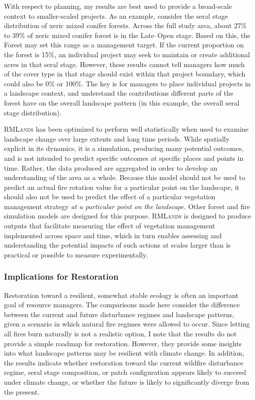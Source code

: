 With respect to planning, my results are best used to provide a broad-scale context to smaller-scaled projects. As an example, consider the seral stage distribution of xeric mixed conifer forests. Across the full study area, about 27\% to 39\% of xeric mixed conifer forest is in the Late--Open stage. Based on this, the Forest may set this range as a management target. If the current proportion on the forest is 15\%, an individual project may seek to maintain or create additional acres in that seral stage. However, these results cannot tell managers how much of the cover type in that stage should exist within that project boundary, which could also be 0\% or 100\%. The key is for managers to place individual projects in a landscape context, and understand the contributions different parts of the forest have on the overall landscape pattern (in this example, the overall seral stage distribution).

\textsc{RMLands} has been optimized to perform well statistically when used to examine landscape change over large extents and long time periods. While spatially explicit in its dynamics, it is a simulation, producing many potential outcomes, and is not intended to predict specific outcomes at specific places and points in time. Rather, the data produced are aggregated in order to develop an understanding of the area as a whole. Because this model should not be used to predict an actual fire rotation value for a particular point on the landscape, it should also not be used to predict the effect of a particular vegetation management strategy \emph{at a particular point on the landscape.} Other forest and fire simulation models are designed for this purpose. \textsc{RMLands} is designed to produce outputs that facilitate measuring the effect of vegetation management implemented across space and time, which in turn enables assessing and understanding the potential impacts of such actions at scales larger than is practical or possible to measure experimentally.  


\subsubsection{Implications for Restoration}

Restoration toward a resilient, somewhat stable ecology is often an important goal of resource managers. The comparisons made here consider the difference between the current and future disturbance regimes and landscape patterns, given a scenario in which natural fire regimes were allowed to occur. Since letting all fires burn naturally is not a realistic option, I note that the results do not provide a simple roadmap for restoration. However, they provide some insights into what landscape patterns may be resilient with climate change. In addition, the results indicate whether restoration toward the current wildfire disturbance regime, seral stage composition, or patch configuration appears likely to succeed under climate change, or whether the future is likely to significantly diverge from the present. 


